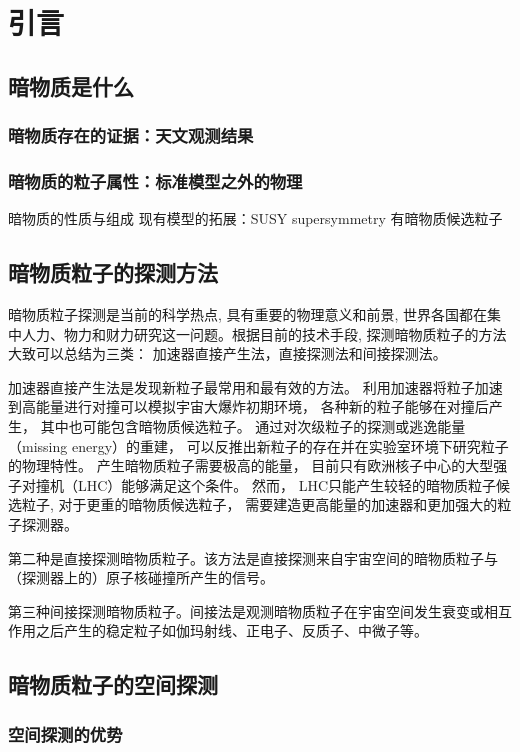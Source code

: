 \chapter{引言}

\section{暗物质是什么}
\subsection{暗物质存在的证据：天文观测结果}

\subsection{暗物质的粒子属性：标准模型之外的物理}
暗物质的性质与组成
现有模型的拓展：SUSY supersymmetry 有暗物质候选粒子


\section{暗物质粒子的探测方法}
暗物质粒子探测是当前的科学热点, 具有重要的物理意义和前景, 世界各国都在集中人力、物力和财力研究这一问题。根据目前的技术手段, 探测暗物质粒子的方法大致可以总结为三类： 加速器直接产生法，直接探测法和间接探测法。

加速器直接产生法是发现新粒子最常用和最有效的方法。
利用加速器将粒子加速到高能量进行对撞可以模拟宇宙大爆炸初期环境， 各种新的粒子能够在对撞后产生， 其中也可能包含暗物质候选粒子。
通过对次级粒子的探测或逃逸能量（missing energy）的重建， 可以反推出新粒子的存在并在实验室环境下研究粒子的物理特性。
产生暗物质粒子需要极高的能量， 目前只有欧洲核子中心的大型强子对撞机（LHC）能够满足这个条件。
然而， LHC只能产生较轻的暗物质粒子候选粒子, 对于更重的暗物质候选粒子， 需要建造更高能量的加速器和更加强大的粒子探测器。

第二种是直接探测暗物质粒子。该方法是直接探测来自宇宙空间的暗物质粒子与（探测器上的）原子核碰撞所产生的信号。

第三种间接探测暗物质粒子。间接法是观测暗物质粒子在宇宙空间发生衰变或相互作用之后产生的稳定粒子如伽玛射线、正电子、反质子、中微子等。

\section{暗物质粒子的空间探测}
\subsection{空间探测的优势}

